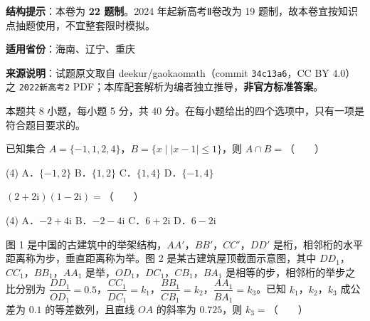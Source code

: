 

\begin{gknotice}
\textbf{结构提示}：本卷为 \textbf{22 题制}。2024 年起新高考Ⅱ卷改为 19 题制，故本卷宜按知识点抽题使用，不宜整套限时模拟。

\textbf{适用省份}：海南、辽宁、重庆

\textbf{来源说明}：试题原文取自 deekur/gaokaomath（commit \texttt{34c13a6}，CC BY 4.0）之 \texttt{2022新高考2} PDF；本库配套解析为编者独立推导，\textbf{非官方标准答案}。
\end{gknotice}

\par\medskip


\begin{gktip}
本题共 8 小题，每小题 5 分，共 40 分。在每小题给出的四个选项中，只有一项是符合题目要求的。
\end{gktip}

已知集合 $A=\{-1,1,2,4\}$，$B=\{x\mid|x-1|\le1\}$，则 $A\cap B=$（　　）

\begin{gkopts}(4)
\task A．$\{-1,2\}$
\task B．$\{1,2\}$
\task C．$\{1,4\}$
\task D．$\{-1,4\}$
\end{gkopts}

$(2+2\mathrm i)(1-2\mathrm i)=$（　　）

\begin{gkopts}(4)
\task A．$-2+4\mathrm i$
\task B．$-2-4\mathrm i$
\task C．$6+2\mathrm i$
\task D．$6-2\mathrm i$
\end{gkopts}

图 1 是中国的古建筑中的举架结构，$AA'$，$BB'$，$CC'$，$DD'$ 是桁，相邻桁的水平距离称为步，垂直距离称为举。图 2 是某古建筑屋顶截面示意图，其中 $DD_1$，$CC_1$，$BB_1$，$AA_1$ 是举，$OD_1$，$DC_1$，$CB_1$，$BA_1$ 是相等的步，相邻桁的举步之比分别为 $\dfrac{DD_1}{OD_1}=0.5$，$\dfrac{CC_1}{DC_1}=k_1$，$\dfrac{BB_1}{CB_1}=k_2$，$\dfrac{AA_1}{BA_1}=k_3$。已知 $k_1$，$k_2$，$k_3$ 成公差为 $0.1$ 的等差数列，且直线 $OA$ 的斜率为 $0.725$，则 $k_3=$（　　）

\begin{center}\end{center}

\begin{center}\end{center}

